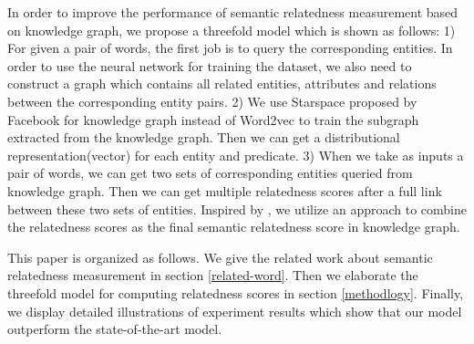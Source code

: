 In order to improve the performance of semantic relatedness measurement based on knowledge graph, 
we propose a threefold model which is shown as follows:
1) For given a pair of words, the first job is to query the corresponding entities. In order to use the
neural network for training the dataset, we also need to construct a graph which contains all related
entities, attributes and relations between the corresponding entity pairs.
2) We use Starspace proposed by Facebook for knowledge graph instead of Word2vec to train the subgraph
extracted from the knowledge graph. Then we can get a distributional representation(vector) for each
entity and predicate. 
3) When we take as inputs a pair of words, we can get two sets of corresponding entities queried from
knowledge graph. Then we can get multiple relatedness scores after a full link between these two sets of entities.
Inspired by \cite{acl/IacobacciPN15}, we utilize an approach to combine the 
relatedness scores as the final semantic relatedness score in knowledge graph.

This paper is organized as follows. We give the related work about semantic relatedness
measurement in section \ref{related-word}. Then we elaborate the threefold model for
computing relatedness scores in section \ref{methodlogy}. Finally, we display detailed
illustrations of experiment results which show that our model outperform the state-of-the-art model.
